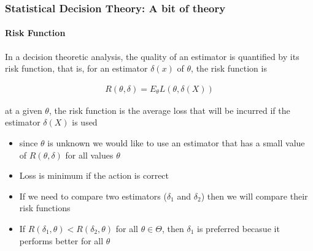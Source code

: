 \documentclass[
  shownotes,
  xcolor={svgnames},
  hyperref={colorlinks,citecolor=DarkBlue,linkcolor=DarkRed,urlcolor=DarkBlue}
  ]{beamer}
\begin{document}
\begin{frame}
\frametitle{Statistical Decision Theory: A bit of theory}
\framesubtitle{Risk Function}
In a decision theoretic analysis, the quality of an estimator is quantified by its risk function, that is, for an estimator $\delta(x)$ of $\theta$, the risk function is 

\begin{align}
      R(\theta,\delta)=E_\theta L(\theta,\delta(X))
    \end{align}

    at a given $\theta$, the risk function is the average loss that will be incurred if the estimator $\delta(X)$ is used


\begin{itemize}
\item since $\theta$ is unknown we would like to use an estimator that has a small value of $R(\theta,\delta)$ for all values $\theta$
\item Loss is minimum if the action is correct
\item If we need to compare two estimators ($\delta_1$ and $\delta_2$) then we will compare their risk functions
\item If $R(\delta_1,\theta)<R(\delta_2,\theta)$ for all $\theta \in \Theta$, then $\delta_1$ is preferred becasue it performs better for all $\theta$

\end{itemize}

\end{frame}
\end{document}
